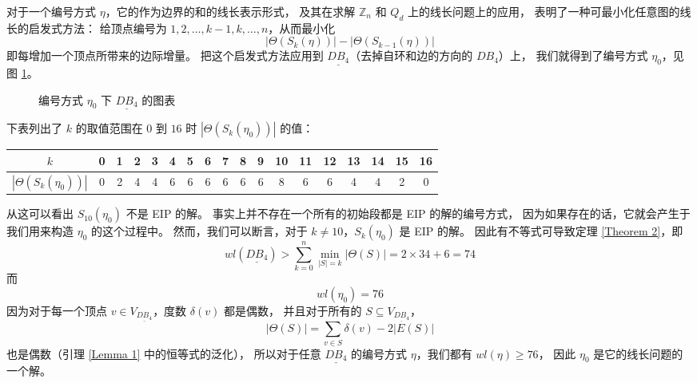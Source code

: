 \documentclass[12pt, a4paper]{article}
\begin{document}
对于一个编号方式 $\eta$，它的作为边界的和的线长表示形式，
及其在求解 $\mathbb{Z}_n$ 和 $Q_d$ 上的线长问题上的应用，
表明了一种可最小化任意图的线长的启发式方法：
给顶点编号为 $1, 2, \dots, k - 1, k, \dots, n$，从而最小化
\begin{equation*}
|\Theta(S_k(\eta))| - |\Theta(S_{k - 1}(\eta))|
\end{equation*}
即每增加一个顶点所带来的边际增量。
把这个启发式方法应用到 $\underline{DB_4}$（去掉自环和边的方向的 $DB_4$）上，
我们就得到了编号方式 $\eta_0$，见图 \ref{Figure 5}。

\begin{figure}
	\centering
	
	\caption{编号方式 $\eta_0$ 下 $\underline{DB_4}$ 的图表}
	\label{Figure 5}
\end{figure}

下表列出了 $k$ 的取值范围在 $0$ 到 $16$ 时 $|\Theta(S_k(\eta_0))|$ 的值：
\begin{center}
	\begin{tabular}{ c | c c c c c c c c c c c c c c c c c }
	$k$                     & 0 & 1 & 2 & 3 & 4 & 5 & 6 & 7 & 8 & 9
	                        & 10 & 11 & 12 & 13 & 14 & 15 & 16 \\
	\hline
	$|\Theta(S_k(\eta_0))|$ & 0 & 2 & 4 & 4 & 6 & 6 & 6 & 6 & 6 & 6
	                        &  8 &  6 &  6 &  4 &  4 &  2 &  0
	\end{tabular}
\end{center}
从这可以看出 $S_{10}(\eta_0)$ 不是 EIP 的解。
事实上并不存在一个所有的初始段都是 EIP 的解的编号方式，
因为如果存在的话，它就会产生于我们用来构造 $\eta_0$ 的这个过程中。
然而，我们可以断言，对于 $k \neq 10$，$S_k(\eta_0)$ 是 EIP 的解。
因此有不等式可导致定理 \ref{Theorem 2}，即
\begin{equation*}
wl(\underline{DB_4}) > \sum_{k = 0}^n \min_{|S| = k} |\Theta(S)| = 2 \times 34 + 6 = 74
\end{equation*}
而
\begin{equation*}
wl(\eta_0) = 76
\end{equation*}
因为对于每一个顶点 $v \in V_{\underline{DB_4}}$，度数 $\delta(v)$ 都是偶数，
并且对于所有的 $S \subseteq V_{\underline{DB_4}}$，
\begin{equation*}
|\Theta(S)| = \sum_{v \in S} \delta(v) - 2 |E(S)|
\end{equation*}
也是偶数（引理 \ref{Lemma 1} 中的恒等式的泛化），
所以对于任意 $\underline{DB_4}$ 的编号方式 $\eta$，我们都有 $wl(\eta) \ge 76$，
因此 $\eta_0$ 是它的线长问题的一个解。
\end{document}
